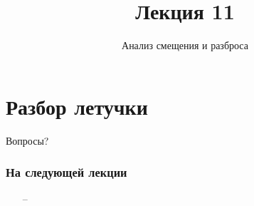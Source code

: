 \documentclass[10pt]{beamer}
\title{Лекция 11}
\subtitle{Анализ смещения и разброса}
\begin{document}
\maketitle

\section{Разбор летучки}

\begin{frame}{}
  
\end{frame}

\begin{frame}[standout]
  Вопросы?
\end{frame}

\appendix

\begin{frame}\frametitle{На следующей лекции}
	\begin{itemize}
    	\item[--]  	    	
	\end{itemize}
\end{frame}
\end{document}
